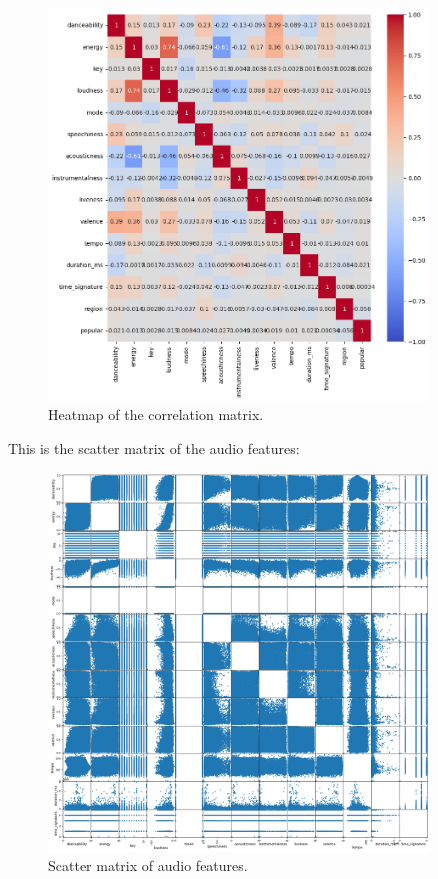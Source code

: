 \begin{figure}[h]
    \centering
    \includegraphics[width=0.9\textwidth]{media/heatmap_cleaned.png} 
    \caption{Heatmap of the correlation matrix.}
    \label{correlation}
\end{figure}

\newpage

This is the scatter matrix of the audio features:

\begin{figure}[h]
    \centering
    \includegraphics[width=0.9\textwidth]{media/scatter_matrix_cleaned.png} 
    \caption{Scatter matrix of audio features.}
    \label{scatter_matrix}
\end{figure}



